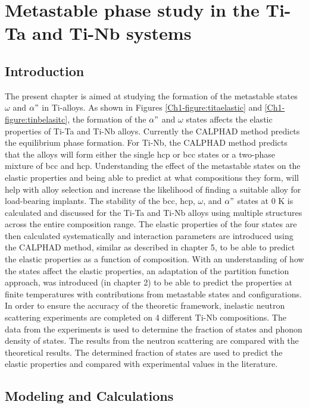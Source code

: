 \chapter{Metastable phase study in the Ti-Ta and Ti-Nb systems}

\section{Introduction}

The present chapter is aimed at studying the formation of the metastable states $\omega$ and $\alpha"$ in Ti-alloys. As shown in Figures \ref{Ch1-figure:titaelastic} and \ref{Ch1-figure:tinbelasitc}, the formation of the $\alpha"$ and $\omega$ states affects the elastic properties of Ti-Ta and Ti-Nb alloys. Currently the CALPHAD method predicts the equilibrium phase formation. For Ti-Nb, the CALPHAD method predicts that the alloys will form either the single hcp or bcc states or a two-phase mixture of bcc and hcp. Understanding the effect of the metastable states on the elastic properties and being able to predict at what compositions they form, will help with alloy selection and increase the likelihood of finding a suitable alloy for load-bearing implants. The stability of the bcc, hcp, $\omega$, and $\alpha"$ states at 0 K is calculated and discussed for the Ti-Ta and Ti-Nb alloys using multiple structures across the entire composition range. The elastic properties of the four states are then calculated systematically and interaction parameters are introduced using the CALPHAD method, similar as described in chapter 5, to be able to predict the elastic properties as a function of composition. With an understanding of how the states affect the elastic properties, an adaptation of the partition function approach, was introduced (in chapter 2) to be able to predict the properties at finite temperatures with contributions from metastable states and configurations. In order to ensure the accuracy of the theoretic framework, inelastic neutron scattering experiments are completed on 4 different Ti-Nb compositions. The data from the experiments is used to determine the fraction of states and phonon density of states. The results from the neutron scattering are compared with the theoretical results. The determined fraction of states are used to predict the elastic properties and compared with experimental values in the literature.

\section{Modeling and Calculations}

